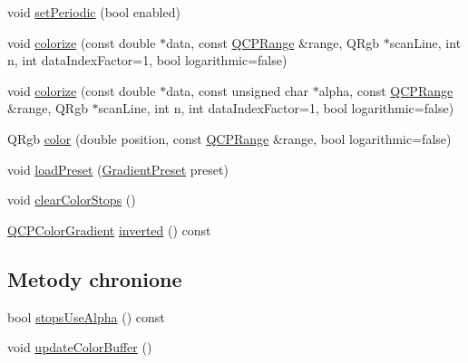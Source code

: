 \begin{DoxyCompactItemize}
\item 
void \hyperlink{class_q_c_p_color_gradient_a39d6448155fc00a219f239220d14bb39}{set\+Periodic} (bool enabled)
\item 
void \hyperlink{class_q_c_p_color_gradient_aaf423ceb943e177b0ed2c48c811d83dc}{colorize} (const double $\ast$data, const \hyperlink{class_q_c_p_range}{Q\+C\+P\+Range} \&range, Q\+Rgb $\ast$scan\+Line, int n, int data\+Index\+Factor=1, bool logarithmic=false)
\item 
void \hyperlink{class_q_c_p_color_gradient_acf0cc7fba83ef21f7b8d5d5258519db3}{colorize} (const double $\ast$data, const unsigned char $\ast$alpha, const \hyperlink{class_q_c_p_range}{Q\+C\+P\+Range} \&range, Q\+Rgb $\ast$scan\+Line, int n, int data\+Index\+Factor=1, bool logarithmic=false)
\item 
Q\+Rgb \hyperlink{class_q_c_p_color_gradient_a0599545c859268b025d2060dea741cea}{color} (double position, const \hyperlink{class_q_c_p_range}{Q\+C\+P\+Range} \&range, bool logarithmic=false)
\item 
void \hyperlink{class_q_c_p_color_gradient_aa0aeec1528241728b9671bf8e60b1622}{load\+Preset} (\hyperlink{class_q_c_p_color_gradient_aed6569828fee337023670272910c9072}{Gradient\+Preset} preset)
\item 
void \hyperlink{class_q_c_p_color_gradient_a939213e85f0d1279519d555c5fcfb6ad}{clear\+Color\+Stops} ()
\item 
\hyperlink{class_q_c_p_color_gradient}{Q\+C\+P\+Color\+Gradient} \hyperlink{class_q_c_p_color_gradient_abe04e1d1ccab3d7aa78f2924faed4916}{inverted} () const 
\end{DoxyCompactItemize}
\subsection*{Metody chronione}
\begin{DoxyCompactItemize}
\item 
bool \hyperlink{class_q_c_p_color_gradient_a0eee10f4daef2cce01f0832d36cd1a8d}{stops\+Use\+Alpha} () const 
\item 
void \hyperlink{class_q_c_p_color_gradient_a353f15ab3ab586eebf1f6b58c3e2707b}{update\+Color\+Buffer} ()
\end{DoxyCompactItemize}
